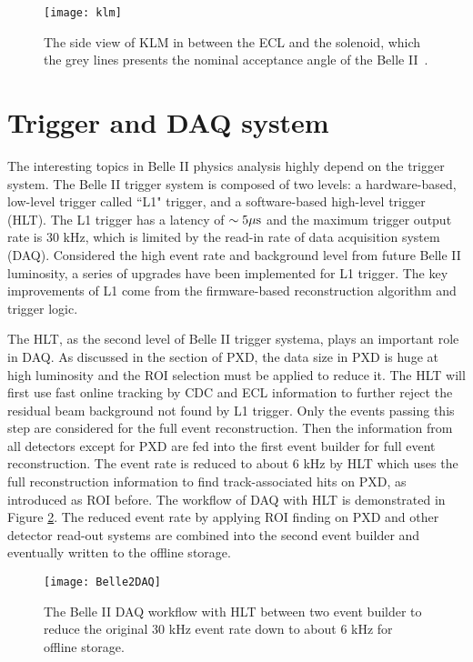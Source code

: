 \begin{figure}[htbp]
	\centering
\texttt{[image: klm]}
\caption{The side view of KLM in between the ECL and the solenoid, which the grey lines presents the nominal acceptance angle of the Belle II~\cite{Abe:2010gxa}. }
\label{fig:klm}
\end{figure}




\section{Trigger and DAQ system}
The interesting topics in Belle II physics analysis highly depend on the trigger system. The Belle II trigger system is composed of two levels: a hardware-based, low-level trigger called ``L1" trigger, and a software-based high-level trigger (HLT). The L1 trigger has a latency of $\sim 5 \-\mu\text{s}$ and the maximum trigger output rate is 30 kHz, which is limited by the read-in rate of data acquisition system (DAQ). Considered the high event rate and background level from future Belle II luminosity, a series of upgrades have been implemented for L1 trigger. The key improvements of L1 come from the firmware-based reconstruction algorithm and trigger logic.

The HLT, as the second level of Belle II trigger systema, plays an important role in DAQ. As discussed in the section of PXD, the data size in PXD is huge at high luminosity and the ROI selection must be applied to reduce it. The HLT will first use fast online tracking by CDC and ECL information to further reject the residual beam background not found by L1 trigger. Only the events passing this step are considered for the full event reconstruction. Then the information from all detectors except for PXD are fed into the first event builder for full event reconstruction. The event rate is reduced to about $6$ kHz by HLT which uses the full reconstruction information to find track-associated hits on PXD, as introduced as ROI before. The workflow of DAQ with HLT is demonstrated in Figure \ref{fig:daq}. The reduced event rate by applying ROI finding on PXD and other detector read-out systems are combined into the second event builder and eventually written to the offline storage. 

\begin{figure}[htbp]
	\centering
	\texttt{[image: Belle2DAQ]}
	\caption{The Belle II DAQ workflow with HLT between two event builder to reduce the original 30 kHz event rate down to about 6 kHz for offline storage.}
	\label{fig:daq}
\end{figure}


